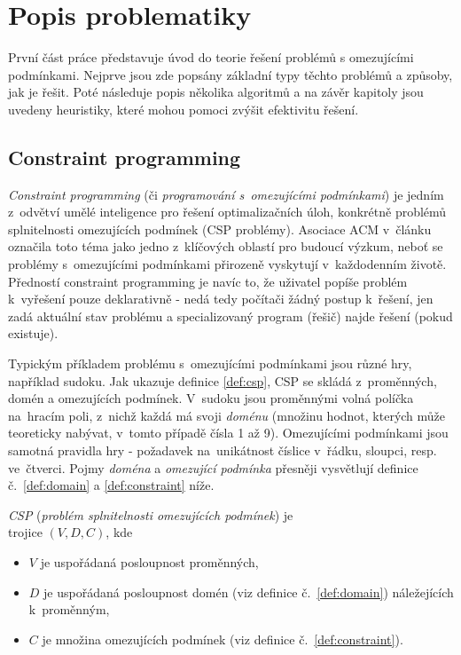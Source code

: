 

\chapter{Popis problematiky}
První část práce představuje úvod do teorie řešení problémů s omezujícími podmínkami. Nejprve jsou zde popsány základní typy těchto problémů a způsoby, jak je řešit. Poté následuje popis několika algoritmů a na závěr kapitoly jsou uvedeny heuristiky, které mohou pomoci zvýšit efektivitu řešení.


\section{Constraint programming}
\emph{Constraint programming} (či \emph{programování s~omezujícími podmínkami}) je jedním z~odvětví umělé inteligence pro řešení optimalizačních úloh, konkrétně problémů splnitelnosti omezujících podmínek (CSP problémy). Asociace ACM v~článku \cite{Wegner1996} označila toto téma jako jedno z~klíčových oblastí pro budoucí výzkum, neboť se problémy s~omezujícími podmínkami přirozeně vyskytují v~každodenním životě. Předností constraint programming je navíc to, že uživatel popíše problém k~vyřešení pouze deklarativně - nedá tedy počítači žádný postup k~řešení, jen zadá aktuální stav problému a specializovaný program (řešič) najde řešení (pokud existuje).

Typickým příkladem problému s~omezujícími podmínkami jsou různé hry, například sudoku. Jak ukazuje definice \ref{def:csp}, CSP se skládá z~proměnných, domén a omezujících podmínek. V~sudoku jsou proměnnými volná políčka na~hracím poli, z~nichž každá má svoji \emph{doménu} (množinu hodnot, kterých může teoreticky nabývat, v~tomto případě čísla 1 až 9). Omezujícími podmínkami jsou samotná pravidla hry - požadavek na~unikátnost číslice v~řádku, sloupci, resp. ve~čtverci. Pojmy \emph{doména} a \emph{omezující podmínka} přesněji vysvětlují definice č.~\ref{def:domain} a \ref{def:constraint} níže.

\begin{definition}
\label{def:csp}
\emph{CSP} (\emph{problém splnitelnosti omezujících podmínek}) je \\ trojice $(V, D, C)$, kde
\begin{itemize}
  \item $V$ je uspořádaná posloupnost proměnných,
  \item $D$ je uspořádaná posloupnost domén (viz definice č.~\ref{def:domain}) náležejících k~proměnným,
  \item $C$ je množina omezujících podmínek (viz definice č.~\ref{def:constraint}).
\end{itemize}
\end{definition}

